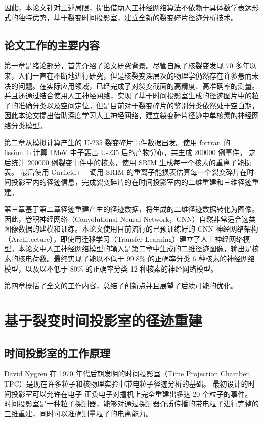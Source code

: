 \documentclass[AutoFakeBold]{LZUThesis}
\begin{document}
因此，本论文针对上述局限，提出借助人工神经网络算法不依赖于具体数学表达形式的独特优势，基于裂变时间投影室，建立全新的裂变碎片径迹分析技术。




\section{论文工作的主要内容}
第一章是绪论部分，首先介绍了论文研究背景。尽管自原子核裂变发现 70 多年以来，人们一直在不断地进行研究，但是核裂变深层次的物理学仍然存在许多悬而未决的问题。在实际应用领域，已经完成了对裂变截面的高精度、高准确率的测量。并且还通过结合使用人工神经网络，实现了基于时间投影室生成的径迹图片中的粒子的准确分类以及空间定位。但是目前对于裂变碎片的鉴别分类依然处于空白期，因此本论文提出借助深度学习人工神经网络，建立裂变碎片径迹中单核素的神经网络分类模型。


第二章从模拟计算产生的 U-235 裂变碎片事件数据出发。使用 fortran 的 fissionlib 计算 1MeV 中子轰击 U-235 后的产物分布，共生成 200000 例事件。
之后统计 200000 例裂变事件中的核素，使用 SRIM 生成每一个核素的重离子能损表。
最后使用 Garfield++ 调用 SRIM 的重离子能损表估算每一个裂变碎片在时间投影室内的径迹信息，完成裂变碎片的在时间投影室内的二维重建和三维径迹重建。

第三章基于第二章径迹重建产生的径迹数据，将生成的二维径迹数据转化为图像。因此，卷积神经网络（Convolutional Neural Network，CNN）自然非常适合这类图像数据的建模和训练。本论文使用目前流行的已预训练好的 CNN 神经网络架构（Architecture），即使用迁移学习（Transfer Learning）建立了人工神经网络模型。本论文中人工神经网络模型的输入是第二章中生成的二维径迹图像，输出是核素的核电荷数。最终实现了能以不低于 99.8\% 的正确率分类 6 种核素的神经网络模型，以及以不低于 80\% 的正确率分类 12 种核素的神经网络模型。


第四章概括了全文的工作内容，总结了创新点并且展望了后续可能的优化。








\chapter{基于裂变时间投影室的径迹重建}
\section{时间投影室的工作原理}
David Nygren 在 1970 年代后期发明的时间投影室（Time Projection Chamber, TPC）是现在许多粒子和核物理实验中带电粒子径迹分析的基础\cite{nygren1978time}。
最初设计的时间投影室可以允许在电子-正负电子对撞机上完全重建出多达 20 个粒子的事件。
时间投影室是一种粒子探测器，能够对通过探测器介质传播的带电粒子进行完整的三维重建，同时可以准确测量粒子的电离能力。
\end{document}
